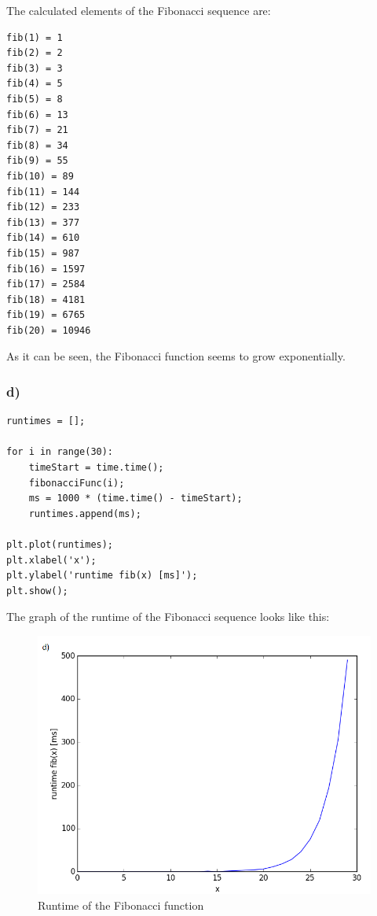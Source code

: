 The calculated elements of the Fibonacci sequence are:

\begin{lstlisting}[caption=Result of 2.3 c), keywordstyle=\color{black}]
fib(1) = 1
fib(2) = 2
fib(3) = 3
fib(4) = 5
fib(5) = 8
fib(6) = 13
fib(7) = 21
fib(8) = 34
fib(9) = 55
fib(10) = 89
fib(11) = 144
fib(12) = 233
fib(13) = 377
fib(14) = 610
fib(15) = 987
fib(16) = 1597
fib(17) = 2584
fib(18) = 4181
fib(19) = 6765
fib(20) = 10946
\end{lstlisting}

As it can be seen, the Fibonacci function seems to grow exponentially.


\subsubsection{d)}

\begin{lstlisting}[caption=Problem 2.3 d)]
runtimes = [];

for i in range(30):
	timeStart = time.time();
	fibonacciFunc(i);
	ms = 1000 * (time.time() - timeStart);
	runtimes.append(ms);

plt.plot(runtimes);
plt.xlabel('x');
plt.ylabel('runtime fib(x) [ms]');
plt.show();
\end{lstlisting}

The graph of the runtime of the Fibonacci sequence looks like this:

\begin{figure}[!ht]
\includegraphics[width=1\textwidth]{chapters/images/figure-2-3-d}
\caption{Runtime of the Fibonacci function}
\end{figure}

